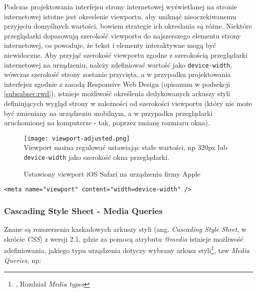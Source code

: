 Podczas projektowania interfejsu strony internetowej wyświetlanej na stronie internetowej istotne jest okreslenie viewportu, aby uniknąć nieoczekiwanemu przyjęciu domyślnych wartości, bowiem strategie ich okreslania są różne. Niektóre przeglądarki dopasowują szerokość viewportu do najszerszego elementu strony internetowej, co powoduje, że tekst i elementy interaktywne mogą być niewidoczne. Aby przyjąć szerokość viewportu zgodne z szerokością przeglądarki internetowej na urządzeniu, należy zdefiniować wartość jako \lstinline{device-width}, wówczas szerokość strony zostanie przycięta, a w przypadku projektowania interfejsu zgodnie z zasadą Responsive Web Design (opisanum w podsekcji \ref{subsubsec:rwd}), istnieje możliwość określenia dedykowanych arkuszy styli definiujących wygląd strony w zależności od szerokości viewportu (który nie może być zmieniany na urządzeniu mobilnym, a w przypadku przeglądarki uruchomionej na komputerze - tak, poprzez zmianę rozmiaru okna).

\begin{figure}[h!]
  \caption[Apple fixed viewport w Safari iOS]{Ustawiony viewport iOS Safari na urządzeniu firmy Apple}
  \centering
    \texttt{[image: viewport-adjusted.png]} \\
    Viewport można regulować ustawiając stałe wartości, np 320px lub \lstinline{device-width} jako szerokość okna przeglądarki.
\end{figure}

\lstset{language=HTML}
\begin{lstlisting}
<meta name="viewport" content="width=device-width" />
\end{lstlisting}

\subsubsection{Cascading Style Sheet - Media Queries}

Znane są rozszerzenia kaskadowych arkuszy styli (ang. \emph{Cascading Style Sheet}, w skrócie \emph{CSS}) z wersji 2.1\cite{css21}, gdzie za pomocą atrybutu \emph{@media} istnieje możliwość zdefiniowania, jakiego typu urządzenia dotyczy wybrany arkusz styli\footnote{\cite{css21}, Rozdział \emph{Media types}}, tzw \emph{Media Queries}, np:

